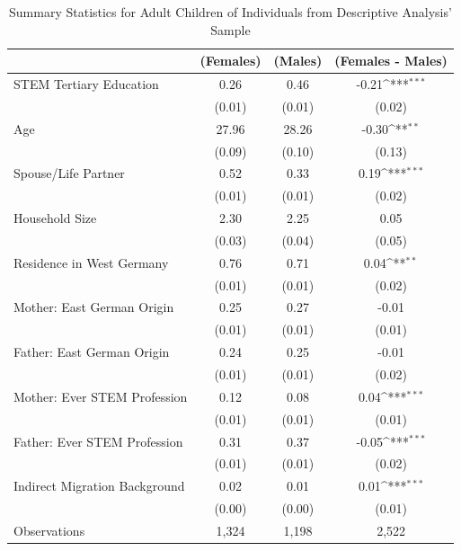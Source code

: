 \documentclass[a4paper, oneside, hyperfootnotes = false]{article}
\def\sym#1{\ifmmode^{#1}\else\(^{#1}\)\fi}
\begin{document}
{\begin{table}[ht]
	\caption[Summary Statistics for Adult Children]{Summary Statistics for Adult Children of Individuals from Descriptive Analysis' Sample}
	\label{tab:descr_summary_epid}
	\begin{center}
		\begin{tabular}{l*{3}{c}}
			\toprule
			& (Females) & (Males) & (Females - Males) \\
			\midrule
			STEM Tertiary Education &  0.26 & 0.46 &   -0.21\sym{***}    \\
			&   (0.01)  & (0.01) & (0.02) \\
			\addlinespace
			Age         &   27.96   &  28.26   &   -0.30\sym{**}     \\
			&     (0.09) &        (0.10)         &      (0.13) \\
			\addlinespace
			Spouse/Life Partner &   0.52     &   0.33  &    0.19\sym{***}     \\
			&      (0.01)&          (0.01)&         (0.02) \\
			\addlinespace
			Household Size      &  2.30   &  2.25   &   0.05        \\
			&          (0.03)&       (0.04)   &   (0.05) \\
			\addlinespace
			Residence in West Germany  &  0.76   &  0.71   &     0.04\sym{**}     \\
			&         (0.01) &       (0.01)&  (0.02)\\
			\addlinespace
			Mother: East German Origin &  0.25   & 0.27    &    -0.01      \\
			&         (0.01) &       (0.01)&  (0.01)\\
			\addlinespace
			Father: East German Origin &  0.24   & 0.25    &   -0.01       \\
			&         (0.01) &       (0.01)&  (0.02)\\
			\addlinespace
			Mother: Ever STEM Profession &  0.12   & 0.08    &  0.04\sym{***}        \\
			&         (0.01) &       (0.01) &  (0.01) \\
			\addlinespace
			Father: Ever STEM Profession &  0.31   &  0.37   &   -0.05\sym{***}       \\
			&         (0.01) &       (0.01)&  (0.02)\\
			\addlinespace
			Indirect Migration Background &  0.02   &   0.01  &   0.01\sym{***}       \\
			&         (0.00) &       (0.00)&  (0.01) \\
			\midrule
			Observations        &  1,324     &  1,198     &        2,522            \\
			\bottomrule
		\end{tabular}
		

\end{center}
\end{table}}
\end{document}
